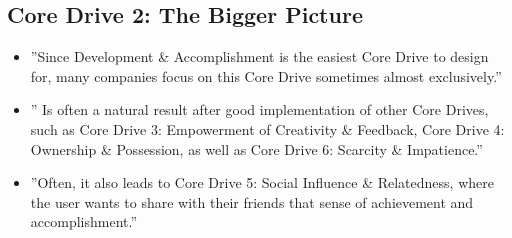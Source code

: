 \subsection{Core Drive 2: The Bigger Picture}
\begin{itemize}
    \item ''Since Development \& Accomplishment is the easiest Core Drive to design for, many companies focus on this Core Drive sometimes almost exclusively.''
    \item '' Is often a natural result after good implementation of other Core Drives, such as Core Drive 3: Empowerment of Creativity \& Feedback, Core Drive 4: Ownership \& Possession, as well as Core Drive 6: Scarcity \& Impatience.''
    \item ''Often, it also leads to Core Drive 5: Social Influence \& Relatedness, where the user wants to share with their friends that sense of achievement and accomplishment.''
\end{itemize}
